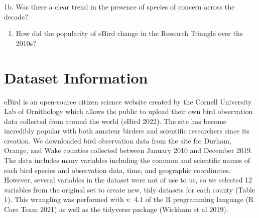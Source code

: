 \documentclass[
  12pt,
]{article}
\providecommand{\tightlist}{%
  \setlength{\itemsep}{0pt}\setlength{\parskip}{0pt}}
\begin{document}
1b. Was there a clear trend in the presence of species of concern across
the decade?

\begin{enumerate}
\def\labelenumi{\arabic{enumi}.}
\setcounter{enumi}{1}
\tightlist
\item
  How did the popularity of eBird change in the Research Triangle over
  the 2010s?
\end{enumerate}

\newpage

\hypertarget{dataset-information}{%
\section{Dataset Information}\label{dataset-information}}

eBird is an open-source citizen science website created by the Cornell
University Lab of Ornithology which allows the public to upload their
own bird observation data collected from around the world (eBird 2022).
The site has become incredibly popular with both amateur birders and
scientific researchers since its creation. We downloaded bird
observation data from the site for Durham, Orange, and Wake counties
collected between January 2010 and December 2019. The data includes many
variables including the common and scientific names of each bird species
and observation data, time, and geographic coordinates. However, several
variables in the dataset were not of use to us, so we selected 12
variables from the original set to create new, tidy datasets for each
county (Table 1). This wrangling was performed with v. 4.1 of the R
programming language (R Core Team 2021) as well as the tidyverse package
(Wickham et al 2019).
\end{document}
